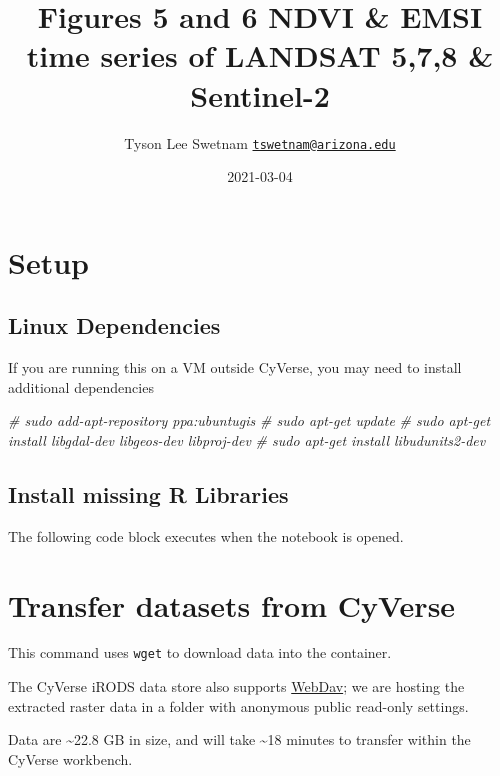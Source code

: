 \documentclass[
]{article}
\title{Figures 5 and 6 NDVI \& EMSI time series of LANDSAT 5,7,8 \& Sentinel-2}
\author{Tyson Lee Swetnam
\href{mailto:tswetnam@arizona.edu}{\nolinkurl{tswetnam@arizona.edu}}}
\date{2021-03-04}
\newenvironment{Shaded}{\begin{snugshade}}{\end{snugshade}}
\newcommand{\CommentTok}[1]{\textcolor[rgb]{0.56,0.35,0.01}{\textit{#1}}}
\begin{document}
\maketitle

\hypertarget{setup}{%
\section{Setup}\label{setup}}

\hypertarget{linux-dependencies}{%
\subsection{Linux Dependencies}\label{linux-dependencies}}

If you are running this on a VM outside CyVerse, you may need to install
additional dependencies

\begin{Shaded}
\begin{Highlighting}[]
\CommentTok{# sudo add-apt-repository ppa:ubuntugis}
\CommentTok{# sudo apt-get update}
\CommentTok{# sudo apt-get install libgdal-dev libgeos-dev libproj-dev}
\CommentTok{# sudo apt-get install libudunits2-dev}
\end{Highlighting}
\end{Shaded}

\hypertarget{install-missing-r-libraries}{%
\subsection{Install missing R
Libraries}\label{install-missing-r-libraries}}

The following code block executes when the notebook is opened.

\hypertarget{transfer-datasets-from-cyverse}{%
\section{Transfer datasets from
CyVerse}\label{transfer-datasets-from-cyverse}}

This command uses \texttt{wget} to download data into the container.

The CyVerse iRODS data store also supports
\href{https://data.cyverse.org}{WebDav}; we are hosting the extracted
raster data in a folder with anonymous public read-only settings.

Data are \textasciitilde22.8 GB in size, and will take \textasciitilde18
minutes to transfer within the CyVerse workbench.
\end{document}
